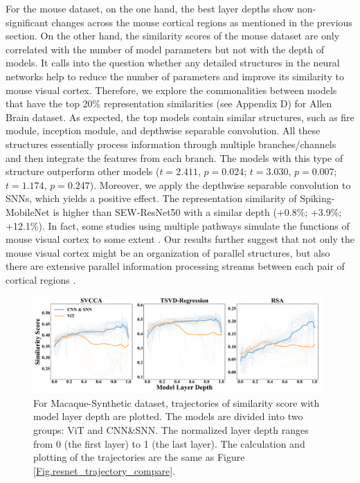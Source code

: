 \documentclass[letterpaper]{article} %
\begin{document}
For the mouse dataset, on the one hand, the best layer depths show non-significant changes across the mouse cortical regions as mentioned in the previous section. On the other hand, the similarity scores of the mouse dataset are only correlated with the number of model parameters but not with the depth of models. It calls into the question whether any detailed structures in the neural networks help to reduce the number of parameters and improve its similarity to mouse visual cortex. Therefore, we explore the commonalities between models that have the top 20\% representation similarities (see Appendix D) for Allen Brain dataset. As expected, the top models contain similar structures, such as fire module, inception module, and depthwise separable convolution. All these structures essentially process information through multiple branches/channels and then integrate the features from each branch. The models with this type of structure outperform other models ($t=2.411$, $p=0.024$; $t=3.030$, $p=0.007$; $t=1.174$, $p=0.247$). Moreover, we apply the depthwise separable convolution to SNNs, which yields a positive effect. The representation similarity of Spiking-MobileNet is higher than SEW-ResNet50 with a similar depth (+0.8\%; +3.9\%; +12.1\%). In fact, some studies using multiple pathways simulate the functions of mouse visual cortex to some extent \cite{shi2022mousenet, nayebi2022mouse}. Our results further suggest that not only the mouse visual cortex might be an organization of parallel structures, but also there are extensive parallel information processing streams between each pair of cortical regions \cite{wang2012network, siegle2021survey}.

\begin{figure}[t]
	\centering
	\includegraphics[width=0.99\textwidth]{figs/trajectory_compare_macaque_synthetic_nv.pdf}
	\caption{For Macaque-Synthetic dataset, trajectories of similarity score with model layer depth are plotted. The models are divided into two groups: ViT and CNN\&SNN. The normalized layer depth ranges from 0 (the first layer) to 1 (the last layer). The calculation and plotting of the trajectories are the same as Figure \ref{Fig.resnet_trajectory_compare}.}
	\label{Fig.trajectory_compare}
\end{figure}
\end{document}
